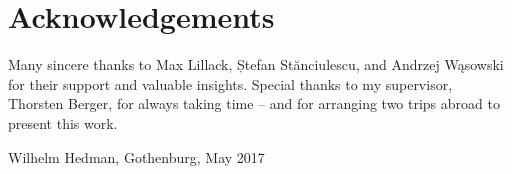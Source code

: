 \thispagestyle{plain}			%
\section*{Acknowledgements}
Many sincere thanks to Max Lillack, Ștefan St\u{a}nciulescu, and Andrzej W\k{a}sowski for their support and valuable insights. Special thanks to my supervisor, Thorsten Berger, for always taking time -- and for arranging two trips abroad to present this work.


\vspace{1.5cm}
\hfill
Wilhelm Hedman, Gothenburg, May 2017

\newpage				%
\thispagestyle{empty}
\mbox{}